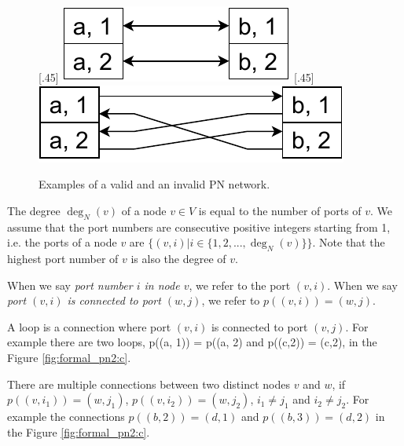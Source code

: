 \begin{figure}[h]
    [.45\linewidth] {
    \centering
    \includegraphics[scale=0.6]{diagrams/formalizing_pn_network_diagram1.pdf}
  }
  \hfill
    [.45\linewidth] {
    \centering
    \includegraphics[scale=0.6]{diagrams/formalizing_pn_network_diagram2.pdf}
  }
  \caption{Examples of a valid and an invalid PN network.}
  \label{fig:formal_pn1}
\end{figure}


The degree $\deg_N(v)$ of a node $v \in V$ is equal to the number of ports of $v$.
We assume that the port numbers are consecutive positive integers starting from 1, i.e. the ports of a node $v$ are $\{(v, i) | i \in \{1, 2, ..., \deg_N(v)\}\}$.
Note that the highest port number of $v$ is also the degree of $v$.

When we say \emph{port number $i$ in node $v$}, we refer to the port $(v, i)$.
When we say \emph{port $(v, i)$ is connected to port $(w, j)$}, we refer to $p((v, i)) = (w, j)$.

A loop is a connection where port $(v, i)$ is connected to port $(v, j)$.
For example there are two loops, p((a, 1)) = p((a, 2) and p((c,2)) = (c,2), in the Figure \ref{fig:formal_pn2:c}.

There are multiple connections between two distinct nodes $v$ and $w$, if $p((v, i_1)) = (w, j_1)$, $p((v, i_2)) = (w, j_2)$, $i_1 \neq j_1$ and $i_2 \neq j_2$.
For example the connections $p((b, 2)) = (d, 1)$ and $p((b, 3)) = (d, 2)$ in the Figure \ref{fig:formal_pn2:c}.


